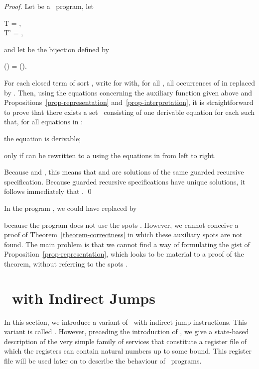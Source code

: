 \documentclass[fleqn]{llncs}
\begin{document}
\begin{proof}
Let  be a \PGLD\ program,
let
\begin{ldispl}
T  = \;, \\
T' = \;,
\end{ldispl}
and let  be the bijection defined by
\begin{ldispl}
\beta() =
\abstr()\;.
\end{ldispl}
For each closed term  of sort , write  for 
with, for all , all occurrences of  in  replaced by
.
Then, using the equations concerning the auxiliary function
 given above and Propositions~\ref{prop-representation}
and~\ref{prop-interpretation}, it is straightforward to prove that there
exists a set~ consisting of one derivable equation  for each
 such that, for all equations  in :
\begin{iteml}
\item
the equation  is derivable;
\item
 only if  can be rewritten to a  using the
equations in  from left to right.
\end{iteml}
Because
 and
,
this means that
 and 
are solutions of the same guarded recursive specification.
Because guarded recursive specifications have unique solutions, it
follows immediately that
.
\qed
\end{proof}
In the program , we could have
replaced  by

because the program  does not use the spots .
However, we cannot conceive a proof of Theorem~\ref{theorem-correctness}
in which these auxiliary spots are not found.
The main problem is that we cannot find a way of formulating the gist of
Proposition~\ref{prop-representation}, which looks to be material to a
proof of the theorem, without referring to the spots
.

\section{\PGLD\ with Indirect Jumps}
\label{sect-PGLDij}

In this section, we introduce a variant of \PGLD\ with indirect jump
instructions.
This variant is called \PGLDij.
However, preceding the introduction of \PGLDij, we give a state-based
description of the very simple family of services that constitute a
register file of which the registers can contain natural numbers up to
some bound.
This register file will be used later on to describe the behaviour of
\PGLDij\ programs.
\end{document}

